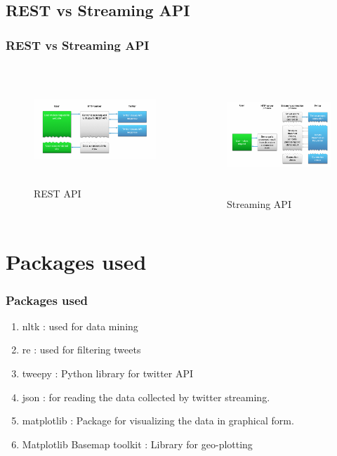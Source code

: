\documentclass{beamer}
\begin{document}
\subsection{REST vs Streaming API}
\begin{frame}
\frametitle{REST vs Streaming API}
\begin{columns}[t]
\begin{figure}
\includegraphics[width=7cm,height=4.1cm]{./Images/REST_API.png}
\caption{REST API}
\end{figure}
\begin{figure}
\includegraphics[width=6cm,height=4.5cm]{./Images/Streaming_API.png}
\caption{Streaming API}
\end{figure}
\end{columns}
\end{frame}

\section{Packages used}
\begin{frame}
\frametitle{Packages used}
\begin{enumerate}
\item nltk : used for data mining
\item re : used for filtering tweets
\item tweepy : Python library for twitter API
\item json : for reading the data collected by twitter streaming.
\item matplotlib : Package for visualizing the data in graphical form.
\item Matplotlib Basemap toolkit : Library for geo-plotting
\end{enumerate}
\end{frame}
\end{document}
